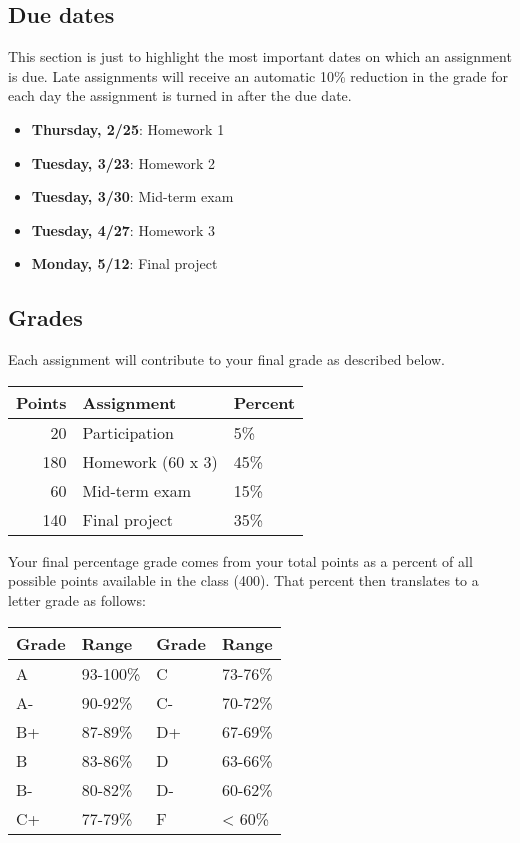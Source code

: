 \documentclass[11pt,]{article}
\providecommand{\tightlist}{%
  \setlength{\itemsep}{0pt}\setlength{\parskip}{0pt}}
\begin{document}
\hypertarget{due-dates}{%
\subsection{Due dates}\label{due-dates}}

This section is just to highlight the most important dates on which an
assignment is due. Late assignments will receive an automatic 10\%
reduction in the grade for each day the assignment is turned in after
the due date.

\begin{itemize}
\tightlist
\item
  \textbf{Thursday, 2/25}: Homework 1
\item
  \textbf{Tuesday, 3/23}: Homework 2
\item
  \textbf{Tuesday, 3/30}: Mid-term exam
\item
  \textbf{Tuesday, 4/27}: Homework 3
\item
  \textbf{Monday, 5/12}: Final project
\end{itemize}

\newpage

\hypertarget{grades}{%
\subsection{Grades}\label{grades}}

Each assignment will contribute to your final grade as described below.

\begin{longtable}[]{@{}rll@{}}
\toprule
Points & Assignment & Percent\tabularnewline
\midrule
\endhead
20 & Participation & 5\%\tabularnewline
180 & Homework (60 x 3) & 45\%\tabularnewline
60 & Mid-term exam & 15\%\tabularnewline
140 & Final project & 35\%\tabularnewline
\bottomrule
\end{longtable}

Your final percentage grade comes from your total points as a percent of
all possible points available in the class (400). That percent then
translates to a letter grade as follows:

\begin{longtable}[]{@{}llll@{}}
\toprule
Grade & Range & Grade & Range\tabularnewline
\midrule
\endhead
A & 93-100\% & C & 73-76\%\tabularnewline
A- & 90-92\% & C- & 70-72\%\tabularnewline
B+ & 87-89\% & D+ & 67-69\%\tabularnewline
B & 83-86\% & D & 63-66\%\tabularnewline
B- & 80-82\% & D- & 60-62\%\tabularnewline
C+ & 77-79\% & F & \textless{} 60\%\tabularnewline
\bottomrule
\end{longtable}
\end{document}
